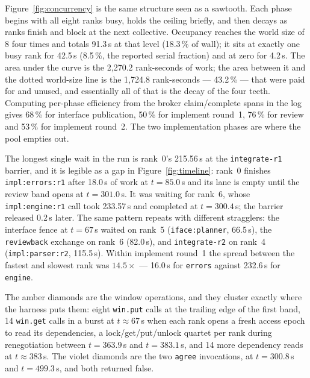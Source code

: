 \documentclass[11pt]{article}
\begin{document}
Figure~\ref{fig:concurrency} is the same structure seen as a sawtooth. Each phase begins with
all eight ranks busy, holds the ceiling briefly, and then decays as ranks finish and block at
the next collective. Occupancy reaches the world size of 8 four times and totals 91.3\,s at
that level (18.3\,\% of wall); it sits at exactly one busy rank for 42.5\,s (8.5\,\%, the
reported serial fraction) and at zero for 4.2\,s. The area under the curve is the 2{,}270.2
rank-seconds of work; the area between it and the dotted world-size line is the 1{,}724.8
rank-seconds --- 43.2\,\% --- that were paid for and unused, and essentially all of that is
the decay of the four teeth. Computing per-phase efficiency from the broker claim/complete
spans in the log gives 68\,\% for interface publication, 50\,\% for implement round~1,
76\,\% for review and 53\,\% for implement round~2. The two implementation phases are where
the pool empties out.

The longest single wait in the run is rank~0's 215.56\,s at the \texttt{integrate-r1}
barrier, and it is legible as a gap in Figure~\ref{fig:timeline}: rank~0 finishes
\texttt{impl:errors:r1} after 18.0\,s of work at $t=85.0$\,s and its lane is empty until the
review band opens at $t=301.0$\,s. It was waiting for rank~6, whose \texttt{impl:engine:r1}
call took 233.57\,s and completed at $t=300.4$\,s; the barrier released 0.2\,s later. The
same pattern repeats with different stragglers: the interface fence at $t=67$\,s waited on
rank~5 (\texttt{iface:planner}, 66.5\,s), the \texttt{reviewback} exchange on rank~6 (82.0\,s),
and \texttt{integrate-r2} on rank~4 (\texttt{impl:parser:r2}, 115.5\,s). Within implement
round~1 the spread between the fastest and slowest rank was $14.5\times$ --- 16.0\,s for
\texttt{errors} against 232.6\,s for \texttt{engine}.

The amber diamonds are the window operations, and they cluster exactly where the harness puts
them: eight \texttt{win.put} calls at the trailing edge of the first band, 14 \texttt{win.get}
calls in a burst at $t\approx67$\,s when each rank opens a fresh access epoch to read its
dependencies, a lock/get/put/unlock quartet per rank during renegotiation between $t=363.9$\,s
and $t=383.1$\,s, and 14 more dependency reads at $t\approx383$\,s. The violet diamonds are
the two \texttt{agree} invocations, at $t=300.8$\,s and $t=499.3$\,s, and both returned false.
\end{document}
